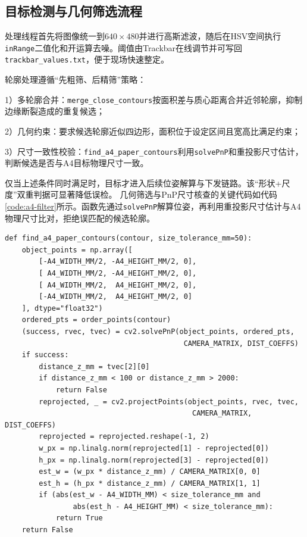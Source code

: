 \subsection{目标检测与几何筛选流程}

处理线程首先将图像统一到\(640\times480\)并进行高斯滤波，随后在HSV空间执行\texttt{inRange}二值化和开运算去噪。阈值由Trackbar在线调节并可写回\texttt{trackbar\_values.txt}，便于现场快速整定。

轮廓处理遵循“先粗筛、后精筛”策略：

1）多轮廓合并：\texttt{merge\_close\_contours}按面积差与质心距离合并近邻轮廓，抑制边缘断裂造成的重复候选；

2）几何约束：要求候选轮廓近似四边形，面积位于设定区间且宽高比满足约束；

3）尺寸一致性校验：\texttt{find\_a4\_paper\_contours}利用\texttt{solvePnP}和重投影尺寸估计，判断候选是否与A4目标物理尺寸一致。

仅当上述条件同时满足时，目标才进入后续位姿解算与下发链路。该“形状+尺度”双重判据可显著降低误检。
几何筛选与PnP尺寸核查的关键代码如代码\ref{code:a4-filter}所示。函数先通过\texttt{solvePnP}解算位姿，再利用重投影尺寸估计与A4物理尺寸比对，拒绝误匹配的候选轮廓。

\begin{lstlisting}[style=pythonstyle, caption={A4目标PnP尺寸筛选（EDC\_Opencv.py）}, label=code:a4-filter]
def find_a4_paper_contours(contour, size_tolerance_mm=50):
    object_points = np.array([
        [-A4_WIDTH_MM/2, -A4_HEIGHT_MM/2, 0],
        [ A4_WIDTH_MM/2, -A4_HEIGHT_MM/2, 0],
        [ A4_WIDTH_MM/2,  A4_HEIGHT_MM/2, 0],
        [-A4_WIDTH_MM/2,  A4_HEIGHT_MM/2, 0]
    ], dtype="float32")
    ordered_pts = order_points(contour)
    (success, rvec, tvec) = cv2.solvePnP(object_points, ordered_pts,
                                          CAMERA_MATRIX, DIST_COEFFS)
    if success:
        distance_z_mm = tvec[2][0]
        if distance_z_mm < 100 or distance_z_mm > 2000:
            return False
        reprojected, _ = cv2.projectPoints(object_points, rvec, tvec,
                                            CAMERA_MATRIX, DIST_COEFFS)
        reprojected = reprojected.reshape(-1, 2)
        w_px = np.linalg.norm(reprojected[1] - reprojected[0])
        h_px = np.linalg.norm(reprojected[3] - reprojected[0])
        est_w = (w_px * distance_z_mm) / CAMERA_MATRIX[0, 0]
        est_h = (h_px * distance_z_mm) / CAMERA_MATRIX[1, 1]
        if (abs(est_w - A4_WIDTH_MM) < size_tolerance_mm and
                abs(est_h - A4_HEIGHT_MM) < size_tolerance_mm):
            return True
    return False
\end{lstlisting}

